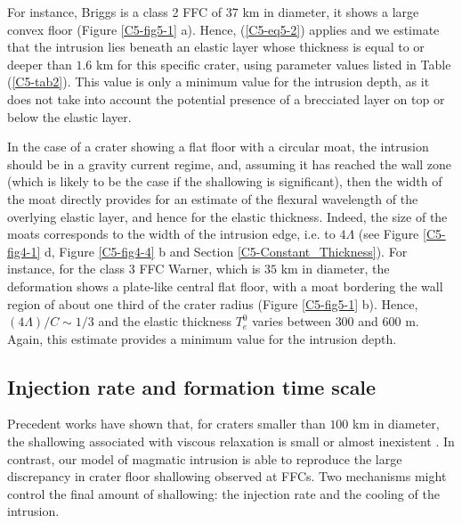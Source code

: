For instance, Briggs is a class 2 FFC of 37 km in diameter, it shows a
large convex floor (Figure \ref{C5-fig5-1} a).  Hence, (\ref{C5-eq5-2})
applies and  we estimate  that the intrusion  lies beneath  an elastic
layer whose  thickness is equal  to or deeper  than $1.6$ km  for this
specific   crater,   using   parameter    values   listed   in   Table
(\ref{C5-tab2}). This value is only  a minimum value for the intrusion
depth, as  it does not take  into account the potential  presence of a
brecciated layer on top or below the elastic layer.
		
In the case of a crater showing a flat floor with a circular moat, the
intrusion should be in a gravity  current regime, and, assuming it has
reached  the  wall  zone (which  is  likely  to  be  the case  if  the
shallowing  is  significant), then  the  width  of the  moat  directly
provides for an  estimate of the flexural wavelength  of the overlying
elastic layer, and hence for  the elastic thickness.  Indeed, the size
of the moats  corresponds to the width of the  intrusion edge, i.e. to
$4\Lambda$ (see Figure \ref{C5-fig4-1} d, Figure \ref{C5-fig4-4} b and
Section \ref{C5-Constant_Thickness}).   For instance, for the  class 3
FFC Warner,  which is  $35$ km  in diameter,  the deformation  shows a
plate-like central flat  floor, with a moat bordering  the wall region
of about  one third of  the crater radius (Figure  \ref{C5-fig5-1} b).
Hence, $(4\Lambda)/C\sim 1/3$ and the elastic thickness $T_e^0$ varies
between $300$  and $600  $ m. Again, this  estimate provides  a minimum
value for the intrusion depth.
			
\subsection{Injection rate and formation time scale}
\label{C5-InjectionRateDiscussion}
		
Precedent works have shown that, for  craters smaller than $100$ km in
diameter, the  shallowing associated with viscous  relaxation is small
or almost  inexistent \citep{Dombard:2001gs}.  In contrast,  our model
of magmatic  intrusion is able  to reproduce the large  discrepancy in
crater floor shallowing observed at FFCs. Two mechanisms might control
the final amount of shallowing: the  injection rate and the cooling of
the intrusion.
		
